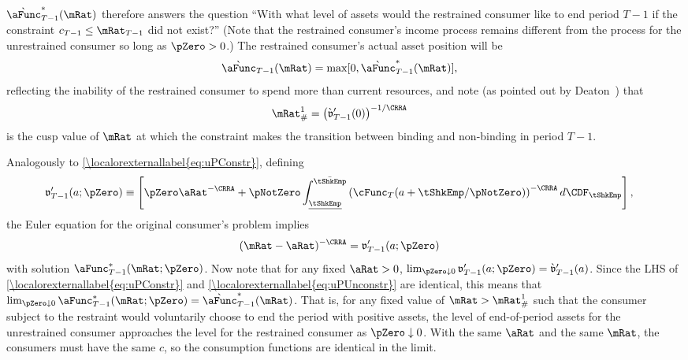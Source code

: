 \documentclass[\econtexRoot/BufferStockTheory]{subfiles}
\begin{document}
$\grave{\aFunc}_{T-1}^{*}(\mRat)$ therefore answers the question ``With what
level of assets would the restrained consumer like to end period $T-1$
if the constraint $c_{T-1} \leq \mRat_{T-1}$ did not exist?''  (Note that
the restrained consumer's income process remains different from the
process for the unrestrained consumer so long as $\pZero>0$.)  The
restrained consumer's actual asset position will be
 \begin{align}
  \grave{\aFunc}_{T-1}(\mRat)  & = \max[0,\grave{\aFunc}^{*}_{T-1}(\mRat)], \notag
\end{align}
reflecting the inability of the restrained consumer to spend more than
current resources, and note (as pointed out by
Deaton~\citeyearpar{deatonLiqConstr}) that
 \begin{align}
  \mRat^{1}_{\#}  & = \left( \grave{\mathfrak{v}}_{T-1}^{\prime}(0)\right)^{-1/\CRRA} \notag
 \end{align}
is the cusp value of $\mRat$ at which the constraint makes the
transition between binding and non-binding in period $T-1$.

Analogously to \eqref{\localorexternallabel{eq:uPConstr}}, defining
\begin{align}
  \mathfrak{v}_{T-1}^{\prime}(a;\pZero)  & \equiv  \left[\pZero \aRat^{-\CRRA}+\pNotZero\int_{\underline{\tShkEmp}}^{\bar{\tShkEmp}} \left(\cFunc_{T}(a+\tShkEmp/\pNotZero)\right)^{-\CRRA} d\CDF_{\tShkEmp}\right], \label{eq:vFrakPrime}
\end{align}
the Euler equation for the original consumer's problem implies
\begin{align}
 (\mRat-\aRat)^{-\CRRA}  & = \mathfrak{v}_{T-1}^{\prime}(a;\pZero) \label{eq:uPUnconstr}
\end{align}
with solution $\aFunc_{T-1}^{*}(\mRat;\pZero)$.  Now note that for any
fixed $\aRat>0$, $\lim_{\pZero \downarrow 0}
\mathfrak{v}_{T-1}^{\prime}(a;\pZero) =
\grave{\mathfrak{v}}_{T-1}^{\prime}(a)$.  Since the LHS of
\eqref{\localorexternallabel{eq:uPConstr}} and \eqref{\localorexternallabel{eq:uPUnconstr}} are identical, this
means that $\lim_{\pZero \downarrow 0}
\aFunc_{T-1}^{*}(\mRat;\pZero) =
\grave{\aFunc}_{T-1}^{*}(\mRat)$.  That is, for any fixed value of
$\mRat > \mRat^{1}_{\#}$ such that the consumer subject to the
restraint would voluntarily choose to end the period with positive
assets, the level of end-of-period assets for the unrestrained
consumer approaches the level for the restrained consumer as $\pZero
\downarrow 0$.  With the same $\aRat$ and the same $\mRat$, the
consumers must have the same $c$, so the consumption functions are
identical in the limit.
\end{document}
